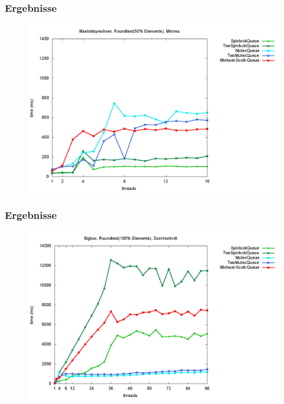 \documentclass[svgnames]{beamer}
\begin{document}
\begin{frame}
\frametitle{Ergebnisse}
\begin {figure}
      \begin{center}
	\includegraphics[width=\textwidth]{manr1m.png}
     \end{center}
\end {figure}
\end{frame}


\begin{frame}
\frametitle{Ergebnisse}
\begin {figure}
      \begin{center}
	\includegraphics[width=\textwidth]{bigboxr2a.png}
     \end{center}
\end {figure}
\end{frame}
\end{document}
